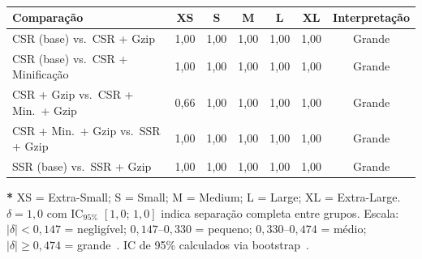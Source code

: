 \begin{table}[htbp]
\centering
\footnotesize
\caption{}
\begin{tabular}{|l|c|c|c|c|c|c|}
\hline
\textbf{Comparação} & \textbf{XS} & \textbf{S} & \textbf{M} & \textbf{L} & \textbf{XL} & \textbf{Interpretação} \\
\hline
CSR (base) vs.\ CSR + Gzip           & 1,00 & 1,00 & 1,00 & 1,00 & 1,00 & Grande \\
CSR (base) vs.\ CSR + Minificação    & 1,00 & 1,00 & 1,00 & 1,00 & 1,00 & Grande \\
CSR + Gzip vs.\ CSR + Min.\ + Gzip  & 0,66 & 1,00 & 1,00 & 1,00 & 1,00 & Grande \\
CSR + Min.\ + Gzip vs.\ SSR + Gzip  & 1,00 & 1,00 & 1,00 & 1,00 & 1,00 & Grande \\
SSR (base) vs.\ SSR + Gzip          & 1,00 & 1,00 & 1,00 & 1,00 & 1,00 & Grande \\
\hline
\end{tabular}
\vspace{2pt}
\begin{flushleft}
\footnotesize
\textbf{*} XS = Extra-Small; S = Small; M = Medium; L = Large; XL = Extra-Large.
$\delta = 1{,}0$ com IC$_{95\%}$ $[1{,}0;\,1{,}0]$ indica separação completa entre grupos.
Escala: $|\delta| < 0{,}147$ = negligível; $0{,}147$--$0{,}330$ = pequeno; $0{,}330$--$0{,}474$ = médio; $|\delta| \geq 0{,}474$ = grande~\cite{Romano2006}.
IC de 95\% calculados via bootstrap~\cite{efron:1994}.
\end{flushleft}
\label{tab:cliffs-delta}
\end{table}
